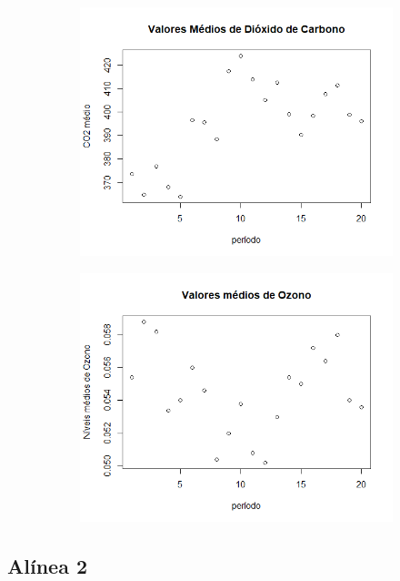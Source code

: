 \documentclass{article}
\begin{document}
 				
 				\begin{figure}
 					 \begin{subfigure}[b]{0.6\textwidth}
   						 \includegraphics[width=\textwidth]{CO2}
 					 \end{subfigure}
 					 \begin{subfigure}[b]{0.6\textwidth}
   						 \includegraphics[width=\textwidth]{Ozono}
 					 \end{subfigure}
 				\end{figure}

\newpage

		\subsection*{Alínea 2}
\end{document}
